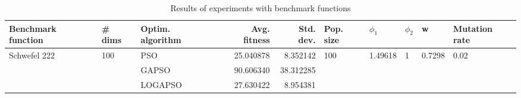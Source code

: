 \begin{table}
\centering
\caption{Results of experiments with benchmark functions}
\begin{tabular}{lllrrlllll}
\toprule
           Benchmark function &              \# dims & Optim. algorithm &  Avg. fitness &  Std. dev. &            Pop. size &               $\phi_{1}$ &         $\phi_{2}$ &                       w &         Mutation rate \\
\midrule
\multirow{3}{*}{Schwefel 222} & \multirow{3}{*}{100} &              PSO &     25.040878 &   8.352142 & \multirow{3}{*}{100} & \multirow{3}{*}{1.49618} & \multirow{3}{*}{1} & \multirow{3}{*}{0.7298} & \multirow{3}{*}{0.02} \\
                              &                      &            GAPSO &     90.606340 &  38.312285 &                      &                          &                    &                         &                       \\
                              &                      &          LOGAPSO &     27.630422 &   8.954381 &                      &                          &                    &                         &                       \\
\bottomrule
\end{tabular}
\end{table}
